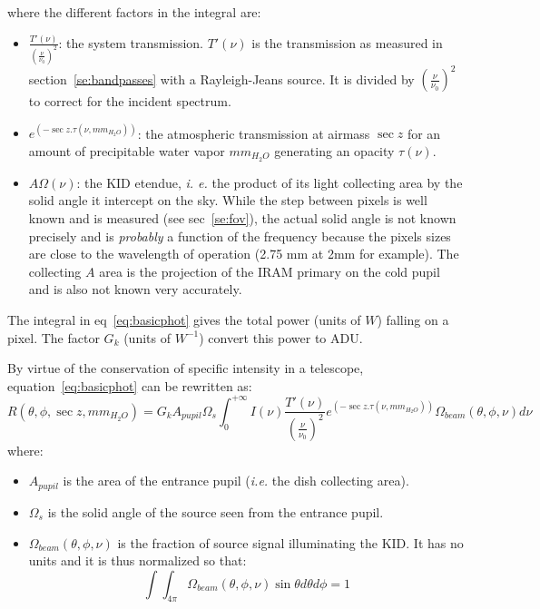 where the different factors in the integral are:
\begin{itemize}
\item $\frac{T'(\nu)}{\left(\frac{\nu}{\nu_{0}}\right)^{2}}$:  the
  system transmission. $T'(\nu)$ is the transmission as measured in
  section~\ref{se:bandpasses} with a Rayleigh-Jeans source. It is
  divided by $\left(\frac{\nu}{\nu_{0}}\right)^{2}$ to correct for the
  incident spectrum.
\item $e^{\left(-\sec z . \tau(\nu,  mm_{H_{2}O} )\right)}$: the
  atmospheric transmission at airmass  $\sec z$ for an amount of
  precipitable water vapor $mm_{H_{2}O}$ generating an opacity $\tau(\nu)$.
\item $A\Omega (\nu) $: the KID etendue, {\it i. e.} the product of
  its light collecting area by the solid angle it intercept on the
  sky. While the step between  pixels is well known and is measured (see sec~\ref{se:fov}), the
  actual solid angle is not known precisely and is {\em probably} a function of the
  frequency  because the pixels sizes are close to the wavelength of
  operation (2.75 mm at 2mm for example). The collecting $A$ area is the
  projection of the IRAM primary on the cold pupil and is also not
  known very accurately.
\end{itemize}
The integral in eq~\ref{eq:basicphot} gives the total power (units of $W$)
falling on a pixel. The factor $G_{k}$ (units of  $W^{-1}$) convert this
power to ADU. 

By virtue of the conservation of specific intensity in a telescope,
equation~\ref{eq:basicphot} can be rewritten as:
\begin{equation}
R(\theta, \phi, \sec z, mm_{H_{2}O}) = G_{k} A_{pupil}\Omega_{s}\int_{0}^{+\infty} I(\nu)
\frac{T'(\nu)}{\left(\frac{\nu}{\nu_{0}}\right)^{2}} e^{\left(-\sec z
  . \tau(\nu,  mm_{H_{2}O})\right)} \Omega_{beam} (\theta, \phi, \nu)  d\nu 
\label{eq:basicphot2}
\end{equation}
where:
\begin{itemize}
\item $A_{pupil}$ is the area of the entrance pupil ({\it i.e.} the
  dish collecting area).
\item $\Omega_{s}$ is the solid angle of the source seen from the
  entrance pupil.
\item $\Omega_{beam}(\theta, \phi, \nu)$ is the fraction of source signal
  illuminating the KID. It has no units and it is thus normalized so that:
\begin{equation}
\int\int_{4\pi} \Omega_{beam}(\theta, \phi, \nu) \sin \theta d\theta
d\phi = 1 
\label{eq:omegabdef}
\end{equation}
\end{itemize}

